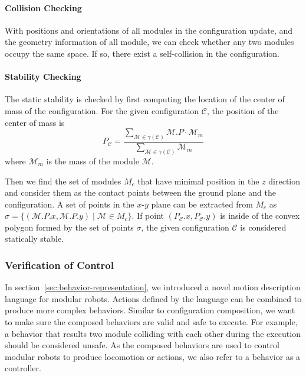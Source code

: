 \documentclass[conference]{IEEEtran}
\theoremstyle{definition}
\begin{document}
\paragraph{Collision Checking} 
With positions and orientations of all modules in the configuration update, and the geometry information of all module, we can check whether any two modules occupy the same space. If so, there exist a self-collision in the configuration.
\paragraph{Stability Checking}
The static stability is checked by first computing the location of the center of mass of the configuration. For the given configuration $\mathcal{C}$, the position of the center of mass is
\begin{equation*}
 P_{\mathcal{C}}=\dfrac{\sum\limits_{\mathcal{M}\in \gamma(\mathcal{C})}{\mathcal{M}.P\cdot \mathcal{M}_m}}{\sum\limits_{\mathcal{M}\in \gamma(\mathcal{C})}{\mathcal{M}_m}}
\end{equation*}
where $\mathcal{M}_m$ is the mass of the module $\mathcal{M}$.

Then we find the set of modules $M_c$ that have minimal position in the $z$ direction and consider them as the contact points between the ground plane and the configuration. A set of points in the $x$-$y$ plane can be extracted from $M_c$ as $\sigma=\{(\mathcal{M}.P.x, \mathcal{M}.P.y)\mid \mathcal{M} \in M_c\}$. If point $(P_\mathcal{C}.x, P_\mathcal{C}.y)$ is inside of the convex polygon formed by the set of points $\sigma$, the given configuration $\mathcal{C}$ is considered statically stable.

\subsubsection{Verification of Control}
In section~\ref{sec:behavior-representation}, we introduced a novel motion description language for modular robots. Actions defined by the language can be combined to produce more complex behaviors. Similar to configuration composition, we want to make sure the composed behaviors are valid and safe to execute. For example, a behavior that results two module colliding with each other during the execution should be considered unsafe. As the composed behaviors are used to control modular robots to produce locomotion or actions, we also refer to a behavior as a controller.
\end{document}
